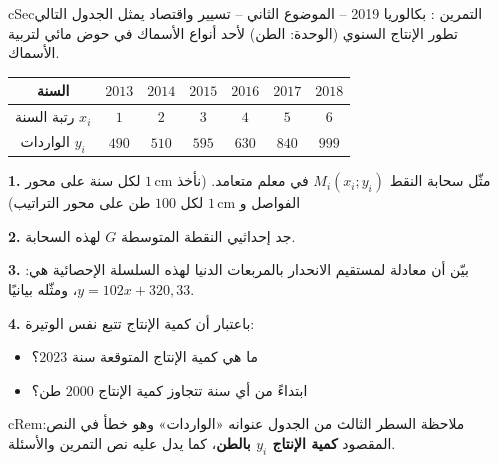 \documentclass[12pt,a4paper]{article}
\newenvironment{BOX}[2]{\begin{otherlanguage}{english}\begin{arbox}{#1}{#2}}{\end{arbox}\end{otherlanguage}}
\newenvironment{molahada}[1][ملاحظة]{\begin{BOX}{cRem}{#1}}{\end{BOX}}
\newcounter{exo}
\newenvironment{tamrin}[1]{\stepcounter{exo}\begin{BOX}{cSec}{التمرين \theexo: #1}}{\end{BOX}}
\newenvironment{sq}{\begin{itemize}[leftmargin=2.4em,itemsep=3pt]}{\end{itemize}}
\newcommand{\qa}{\item[(أ)]}\newcommand{\qb}{\item[(ب)]}\newcommand{\qc}{\item[(جـ)]}\newcommand{\qd}{\item[(د)]}\newcommand{\qe}{\item[(هـ)]}
\newcommand{\QQ}[1]{\par\smallskip\textbf{#1.} }
\begin{document}
\begin{tamrin}{بكالوريا 2019 -- الموضوع الثاني -- تسيير واقتصاد}
يمثل الجدول التالي تطور الإنتاج السنوي (الوحدة: الطن) لأحد أنواع الأسماك في حوض مائي لتربية الأسماك.
\begin{center}
\begin{tabular}{|C|c|c|c|c|c|c|}\hline
{} السنة & $2013$ & $2014$ & $2015$ & $2016$ & $2017$ & $2018$\\\hline
رتبة السنة $x_i$ & $1$ & $2$ & $3$ & $4$ & $5$ & $6$\\\hline
الواردات $y_i$ & $490$ & $510$ & $595$ & $630$ & $840$ & $999$\\\hline
\end{tabular}
\end{center}

\QQ{1} مثّل سحابة النقط $M_i(x_i;y_i)$ في معلم متعامد. (نأخذ $1\,\text{cm}$ لكل سنة على محور الفواصل و $1\,\text{cm}$ لكل $100$ طن على محور التراتيب)
\QQ{2} جد إحداثيي النقطة المتوسطة $G$ لهذه السحابة.
\QQ{3} بيّن أن معادلة لمستقيم الانحدار بالمربعات الدنيا لهذه السلسلة الإحصائية هي: $y=102x+320{,}33$، ومثّله بيانيًا.
\QQ{4} باعتبار أن كمية الإنتاج تتبع نفس الوتيرة:
\begin{sq}
\qa ما هي كمية الإنتاج المتوقعة سنة $2023$؟
\qb ابتداءً من أي سنة تتجاوز كمية الإنتاج $2000$ طن؟
\end{sq}
\end{tamrin}
\begin{molahada}
السطر الثالث من الجدول عنوانه «الواردات» وهو خطأ في النص: المقصود \textbf{كمية الإنتاج $y_i$ بالطن}، كما يدل عليه نص التمرين والأسئلة.
\end{molahada}
\Needspace{14.5cm}
\end{document}
